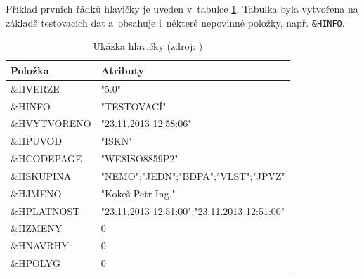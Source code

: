 \documentclass[a4paper,12pt,oneside]{book}
\begin{document}
Příklad prvních řádků hlavičky je uveden v~tabulce \ref{t_hlavicka_priklad}. Tabulka byla vytvořena na základě testovacích dat a~obsahuje i~některé nepovinné položky, např. \texttt{\&HINFO}.

\begin{table}[htbp]
\centering
\caption[Ukázka hlavičky]{Ukázka hlavičky (zdroj: \cite{vfk_struktura})}
\begin{tabular}{ll}
\toprule
\textbf{Položka} & \textbf{Atributy} \\ 
\midrule
\&HVERZE & "5.0" \\ 
\&HINFO & "TESTOVACÍ" \\ 
\&HVYTVORENO & "23.11.2013 12:58:06" \\ 
\&HPUVOD & "ISKN" \\ 
\&HCODEPAGE & "WE8ISO8859P2" \\ 
\&HSKUPINA & "NEMO";"JEDN";"BDPA";"VLST";"JPVZ" \\ 
\&HJMENO & "Kokeš Petr Ing." \\ 
\&HPLATNOST & "23.11.2013 12:51:00";"23.11.2013 12:51:00" \\ 
\&HZMENY & 0 \\ 
\&HNAVRHY & 0 \\ 
\&HPOLYG & 0 \\ 
\bottomrule
\end{tabular}
\label{t_hlavicka_priklad}
\end{table}
\end{document}
